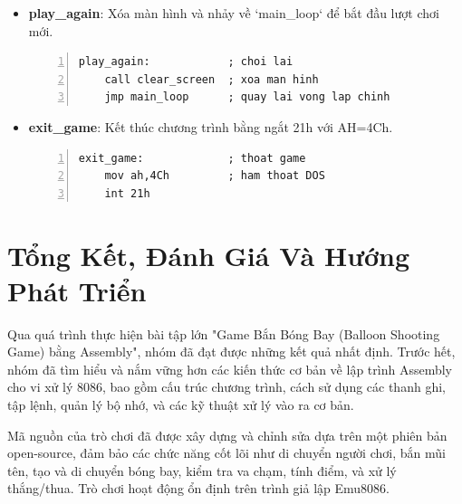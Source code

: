 \documentclass[12pt,a4paper,openany,oneside]{report}
\begin{document}
\begin{itemize}
\begin{lstlisting}[caption={Mã nguồn nhãn win_game}, basicstyle=\ttfamily\footnotesize, numbers=left, numberstyle=\tiny, stepnumber=1, numbersep=5pt, breaklines=true, language={[x86masm]Assembler}]
    ; reset bien
    mov miss, 0d
    mov hits, 0d
    mov player_pos, 1760d
    mov arrow_pos, 0d
    mov arrow_status, 0d
    mov arrow_limit, 22d
    mov loon_pos, 3860d
    mov loon_status, 0d
    mov direction, 0d
\end{lstlisting} 
    \item \textbf{play\_again}: Xóa màn hình và nhảy về `main_loop` để bắt đầu lượt chơi mới.
\begin{lstlisting}[caption={Mã nguồn nhãn play_again}, basicstyle=\ttfamily\footnotesize, numbers=left, numberstyle=\tiny, stepnumber=1, numbersep=5pt, breaklines=true, language={[x86masm]Assembler}]
play_again:            ; choi lai
    call clear_screen  ; xoa man hinh
    jmp main_loop      ; quay lai vong lap chinh
\end{lstlisting}
    \item \textbf{exit\_game}: Kết thúc chương trình bằng ngắt 21h với AH=4Ch.
\begin{lstlisting}[caption={Mã nguồn nhãn exit_game}, basicstyle=\ttfamily\footnotesize, numbers=left, numberstyle=\tiny, stepnumber=1, numbersep=5pt, breaklines=true, language={[x86masm]Assembler}]
exit_game:             ; thoat game
    mov ah,4Ch         ; ham thoat DOS
    int 21h
\end{lstlisting}
\end{itemize}





\chapter{Tổng Kết, Đánh Giá Và Hướng Phát Triển}
Qua quá trình thực hiện bài tập lớn "Game Bắn Bóng Bay (Balloon Shooting Game) bằng Assembly", nhóm đã đạt được những kết quả nhất định. Trước hết, nhóm đã tìm hiểu và nắm vững hơn các kiến thức cơ bản về lập trình Assembly cho vi xử lý 8086, bao gồm cấu trúc chương trình, cách sử dụng các thanh ghi, tập lệnh, quản lý bộ nhớ, và các kỹ thuật xử lý vào ra cơ bản.

Mã nguồn của trò chơi đã được xây dựng và chỉnh sửa dựa trên một phiên bản open-source, đảm bảo các chức năng cốt lõi như di chuyển người chơi, bắn mũi tên, tạo và di chuyển bóng bay, kiểm tra va chạm, tính điểm, và xử lý thắng/thua. Trò chơi hoạt động ổn định trên trình giả lập Emu8086.
\end{document}
